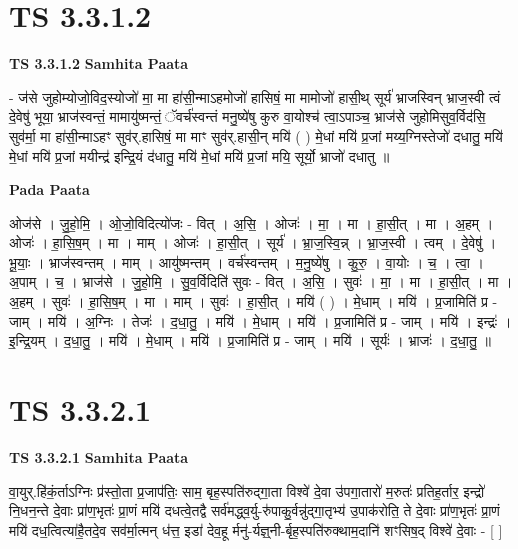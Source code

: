 \documentclass[17pt]{extarticle}
\begin{document}
\section{ TS 3.3.1.2 }

\textbf{TS 3.3.1.2 } \newline
\textbf{Samhita Paata} \newline

- ज॑से जुहोम्योजो॒विद॒स्योजो॑ मा॒ मा हा॑सी॒न्माऽहमोजो॑ हासिषं॒ मा मामोजो॑ हासी॒थ् सूर्य॑ भ्राजस्विन् भ्राज॒स्वी त्वं दे॒वेषु॑ भूया॒ भ्राज॑स्वन्तं॒ मामायु॑ष्मन्तं॒ ॅवर्च॑स्वन्तं मनु॒ष्ये॑षु कुरु वा॒योश्च॑ त्वा॒ऽपाञ्च॒ भ्राज॑से जुहोमिसुव॒र्विद॑सि॒ सुव॑र्मा॒ मा हा॑सी॒न्माऽहꣳ सुव॑र्.हासिषं॒ मा माꣳ सुव॑र्.हासी॒न् मयि॑ ( ) मे॒धां मयि॑ प्र॒जां मय्य॒ग्निस्तेजो॑ दधातु॒ मयि॑ मे॒धां मयि॑ प्र॒जां मयीन्द्र॑ इन्द्रि॒यं द॑धातु॒ मयि॑ मे॒धां मयि॑ प्र॒जां मयि॒ सूर्यो॒ भ्राजो॑ दधातु ॥ \newline

\textbf{Pada Paata} \newline

ओज॑से । जु॒हो॒मि॒ । ओ॒जो॒विदित्यो॑जः - वित् । अ॒सि॒ । ओजः॑ । मा॒ । मा । हा॒सी॒त् । मा । अ॒हम् । ओजः॑ । हा॒सि॒ष॒म् । मा । माम् । ओजः॑ । हा॒सी॒त् । सूर्य॑ । भ्रा॒ज॒स्वि॒न्न् । भ्रा॒ज॒स्वी । त्वम् । दे॒वेषु॑ । भू॒याः॒ । भ्राज॑स्वन्तम् । माम् । आयु॑ष्मन्तम् । वर्च॑स्वन्तम् । म॒नु॒ष्ये॑षु । कु॒रु॒ । वा॒योः । च॒ । त्वा॒ । अ॒पाम् । च॒ । भ्राज॑से । जु॒हो॒मि॒ । सु॒व॒र्विदिति॑ सुवः - वित् । अ॒सि॒ । सुवः॑ । मा॒ । मा । हा॒सी॒त् । मा । अ॒हम् । सुवः॑ । हा॒सि॒ष॒म् । मा । माम् । सुवः॑ । हा॒सी॒त् । मयि॑ ( ) । मे॒धाम् । मयि॑ । प्र॒जामिति॑ प्र - जाम् । मयि॑ । अ॒ग्निः । तेजः॑ । द॒धा॒तु॒ । मयि॑ । मे॒धाम् । मयि॑ । प्र॒जामिति॑ प्र - जाम् । मयि॑ । इन्द्रः॑ । इ॒न्द्रि॒यम् । द॒धा॒तु॒ । मयि॑ । मे॒धाम् । मयि॑ । प्र॒जामिति॑ प्र - जाम् । मयि॑ । सूर्यः॑ । भ्राजः॑ । द॒धा॒तु॒ ॥  \newline





\section{ TS 3.3.2.1 }

\textbf{TS 3.3.2.1 } \newline
\textbf{Samhita Paata} \newline

वा॒युर्.हि॑कं॒र्ताऽग्निः प्र॑स्तो॒ता प्र॒जाप॑तिः॒ साम॒ बृह॒स्पति॑रुद्गा॒ता विश्वे॑ दे॒वा उ॑पगा॒तारो॑ म॒रुतः॑ प्रतिह॒र्तार॒ इन्द्रो॑ नि॒धन॒न्ते दे॒वाः प्रा॑ण॒भृतः॑ प्रा॒णं मयि॑ दधत्वे॒तद्वै सर्व॑मद्ध्व॒र्यु-रु॑पाकु॒र्वन्नु॑द्गा॒तृभ्य॑ उ॒पाक॑रोति॒ ते दे॒वाः प्रा॑ण॒भृतः॑ प्रा॒णं मयि॑ दध॒त्वित्या॑है॒तदे॒व सव॑र्मा॒त्मन् ध॑त्त॒ इडा॑ देव॒हू र्मनु॑-र्यज्ञ्॒नी-र्बृह॒स्पति॑रुक्थाम॒दानि॑ शꣳसिष॒द् विश्वे॑ दे॒वाः - [  ] \newline
\end{document}
